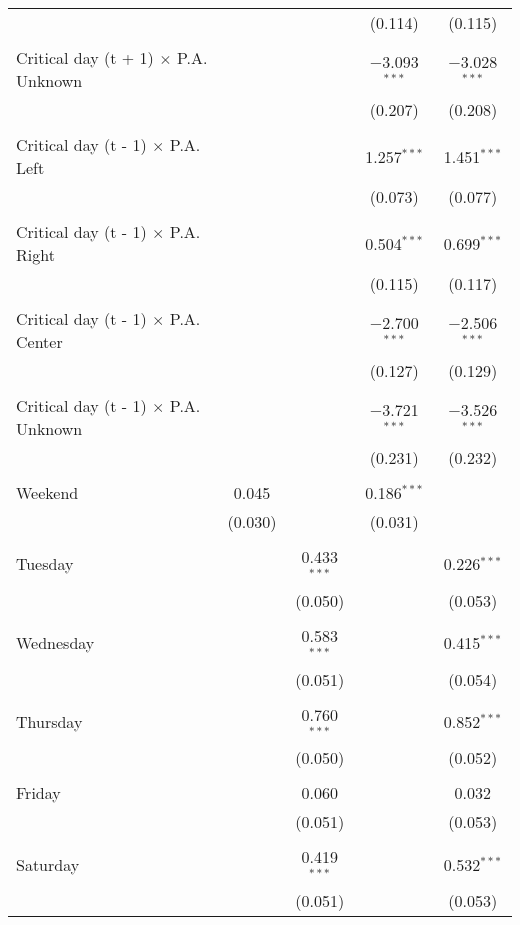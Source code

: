\documentclass[
]{article}
\begin{document}
\begin{table}[!htbp]
{\begin{tabular}{@{\extracolsep{5pt}}lcccc}
  &  &  & (0.114) & (0.115) \\ 
  & & & & \\ 
 Critical day (t + 1) $\times$ P.A. Unknown &  &  & $-$3.093$^{***}$ & $-$3.028$^{***}$ \\ 
  &  &  & (0.207) & (0.208) \\ 
  & & & & \\ 
 Critical day (t - 1) $\times$ P.A. Left &  &  & 1.257$^{***}$ & 1.451$^{***}$ \\ 
  &  &  & (0.073) & (0.077) \\ 
  & & & & \\ 
 Critical day (t - 1) $\times$ P.A. Right &  &  & 0.504$^{***}$ & 0.699$^{***}$ \\ 
  &  &  & (0.115) & (0.117) \\ 
  & & & & \\ 
 Critical day (t - 1) $\times$ P.A. Center &  &  & $-$2.700$^{***}$ & $-$2.506$^{***}$ \\ 
  &  &  & (0.127) & (0.129) \\ 
  & & & & \\ 
 Critical day (t - 1) $\times$ P.A. Unknown &  &  & $-$3.721$^{***}$ & $-$3.526$^{***}$ \\ 
  &  &  & (0.231) & (0.232) \\ 
  & & & & \\ 
 Weekend & 0.045 &  & 0.186$^{***}$ &  \\ 
  & (0.030) &  & (0.031) &  \\ 
  & & & & \\ 
 Tuesday &  & 0.433$^{***}$ &  & 0.226$^{***}$ \\ 
  &  & (0.050) &  & (0.053) \\ 
  & & & & \\ 
 Wednesday &  & 0.583$^{***}$ &  & 0.415$^{***}$ \\ 
  &  & (0.051) &  & (0.054) \\ 
  & & & & \\ 
 Thursday &  & 0.760$^{***}$ &  & 0.852$^{***}$ \\ 
  &  & (0.050) &  & (0.052) \\ 
  & & & & \\ 
 Friday &  & 0.060 &  & 0.032 \\ 
  &  & (0.051) &  & (0.053) \\ 
  & & & & \\ 
 Saturday &  & 0.419$^{***}$ &  & 0.532$^{***}$ \\ 
  &  & (0.051) &  & (0.053) \\ 

\end{tabular}}
\end{table}
\end{document}

